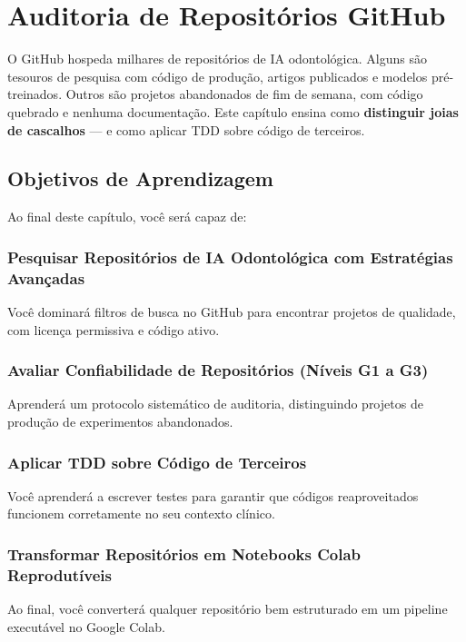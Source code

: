 \chapter{Auditoria de Repositórios GitHub}
\label{cap:auditoria-github}
\nivelquatro

O GitHub hospeda milhares de repositórios de IA odontológica. Alguns são
tesouros de pesquisa com código de produção, artigos publicados e modelos
pré-treinados. Outros são projetos abandonados de fim de semana, com
código quebrado e nenhuma documentação. Este capítulo ensina como
\textbf{distinguir joias de cascalhos} — e como aplicar TDD sobre
código de terceiros.

\section{Objetivos de Aprendizagem}

Ao final deste capítulo, você será capaz de:

\subsection{Pesquisar Repositórios de IA Odontológica com Estratégias Avançadas}
Você dominará filtros de busca no GitHub para encontrar projetos de qualidade, com licença permissiva e código ativo.

\subsection{Avaliar Confiabilidade de Repositórios (Níveis G1 a G3)}
Aprenderá um protocolo sistemático de auditoria, distinguindo projetos de produção de experimentos abandonados.

\subsection{Aplicar TDD sobre Código de Terceiros}
Você aprenderá a escrever testes para garantir que códigos reaproveitados funcionem corretamente no seu contexto clínico.

\subsection{Transformar Repositórios em Notebooks Colab Reprodutíveis}
Ao final, você converterá qualquer repositório bem estruturado em um pipeline executável no Google Colab.

